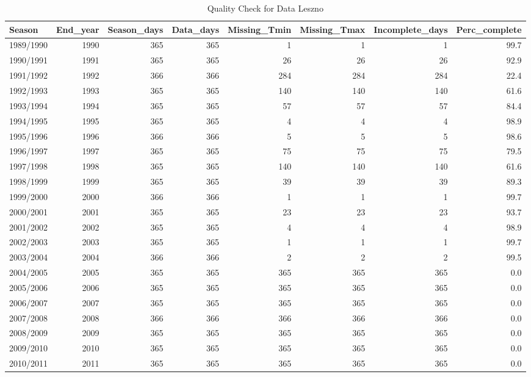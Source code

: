 \documentclass[
]{book}
\begin{document}
\begin{table}

\caption{\label{tab:unnamed-chunk-32}Quality Check  for Data Leszno }
\fontsize{10}{12}\selectfont
\begin{tabular}[t]{l|r|r|r|r|r|r|r}
\hline
Season & End\_year & Season\_days & Data\_days & Missing\_Tmin & Missing\_Tmax & Incomplete\_days & Perc\_complete\\
\hline
1989/1990 & 1990 & 365 & 365 & 1 & 1 & 1 & 99.7\\
\hline
1990/1991 & 1991 & 365 & 365 & 26 & 26 & 26 & 92.9\\
\hline
1991/1992 & 1992 & 366 & 366 & 284 & 284 & 284 & 22.4\\
\hline
1992/1993 & 1993 & 365 & 365 & 140 & 140 & 140 & 61.6\\
\hline
1993/1994 & 1994 & 365 & 365 & 57 & 57 & 57 & 84.4\\
\hline
1994/1995 & 1995 & 365 & 365 & 4 & 4 & 4 & 98.9\\
\hline
1995/1996 & 1996 & 366 & 366 & 5 & 5 & 5 & 98.6\\
\hline
1996/1997 & 1997 & 365 & 365 & 75 & 75 & 75 & 79.5\\
\hline
1997/1998 & 1998 & 365 & 365 & 140 & 140 & 140 & 61.6\\
\hline
1998/1999 & 1999 & 365 & 365 & 39 & 39 & 39 & 89.3\\
\hline
1999/2000 & 2000 & 366 & 366 & 1 & 1 & 1 & 99.7\\
\hline
2000/2001 & 2001 & 365 & 365 & 23 & 23 & 23 & 93.7\\
\hline
2001/2002 & 2002 & 365 & 365 & 4 & 4 & 4 & 98.9\\
\hline
2002/2003 & 2003 & 365 & 365 & 1 & 1 & 1 & 99.7\\
\hline
2003/2004 & 2004 & 366 & 366 & 2 & 2 & 2 & 99.5\\
\hline
2004/2005 & 2005 & 365 & 365 & 365 & 365 & 365 & 0.0\\
\hline
2005/2006 & 2006 & 365 & 365 & 365 & 365 & 365 & 0.0\\
\hline
2006/2007 & 2007 & 365 & 365 & 365 & 365 & 365 & 0.0\\
\hline
2007/2008 & 2008 & 366 & 366 & 366 & 366 & 366 & 0.0\\
\hline
2008/2009 & 2009 & 365 & 365 & 365 & 365 & 365 & 0.0\\
\hline
2009/2010 & 2010 & 365 & 365 & 365 & 365 & 365 & 0.0\\
\hline
2010/2011 & 2011 & 365 & 365 & 365 & 365 & 365 & 0.0\\

\end{tabular}
\end{table}
\end{document}
